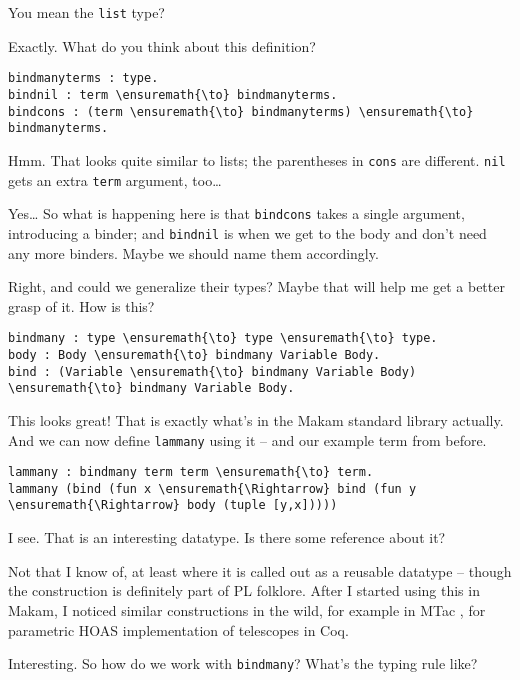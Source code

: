 \heroSTUDENT{} You mean the \texttt{list} type?

\heroADVISOR{} Exactly. What do you think about this definition?

\begin{verbatim}
bindmanyterms : type.
bindnil : term \ensuremath{\to} bindmanyterms.
bindcons : (term \ensuremath{\to} bindmanyterms) \ensuremath{\to} bindmanyterms.
\end{verbatim}

\heroSTUDENT{} Hmm. That looks quite similar to lists; the parentheses in
\texttt{cons} are different. \texttt{nil} gets an extra \texttt{term}
argument, too\ldots{}

\heroADVISOR{} Yes\ldots{} So what is happening here is that \texttt{bindcons}
takes a single argument, introducing a binder; and \texttt{bindnil} is
when we get to the body and don't need any more binders. Maybe we should
name them accordingly.

\heroSTUDENT{} Right, and could we generalize their types? Maybe that will
help me get a better grasp of it. How is this?

\begin{verbatim}
bindmany : type \ensuremath{\to} type \ensuremath{\to} type.
body : Body \ensuremath{\to} bindmany Variable Body.
bind : (Variable \ensuremath{\to} bindmany Variable Body) \ensuremath{\to} bindmany Variable Body.
\end{verbatim}

\heroADVISOR{} This looks great! That is exactly what's in the Makam standard
library actually. And we can now define \texttt{lammany} using it -- and
our example term from before.

\begin{verbatim}
lammany : bindmany term term \ensuremath{\to} term.
lammany (bind (fun x \ensuremath{\Rightarrow} bind (fun y \ensuremath{\Rightarrow} body (tuple [y,x]))))
\end{verbatim}

\heroSTUDENT{} I see. That is an interesting datatype. Is there some reference
about it?

\heroADVISOR{} Not that I know of, at least where it is called out as a
reusable datatype -- though the construction is definitely part of PL
folklore. After I started using this in Makam, I noticed similar
constructions in the wild, for example in MTac \citep{ziliani2013mtac},
for parametric HOAS implementation of telescopes in Coq.

\heroSTUDENT{} Interesting. So how do we work with \texttt{bindmany}? What's
the typing rule like?

